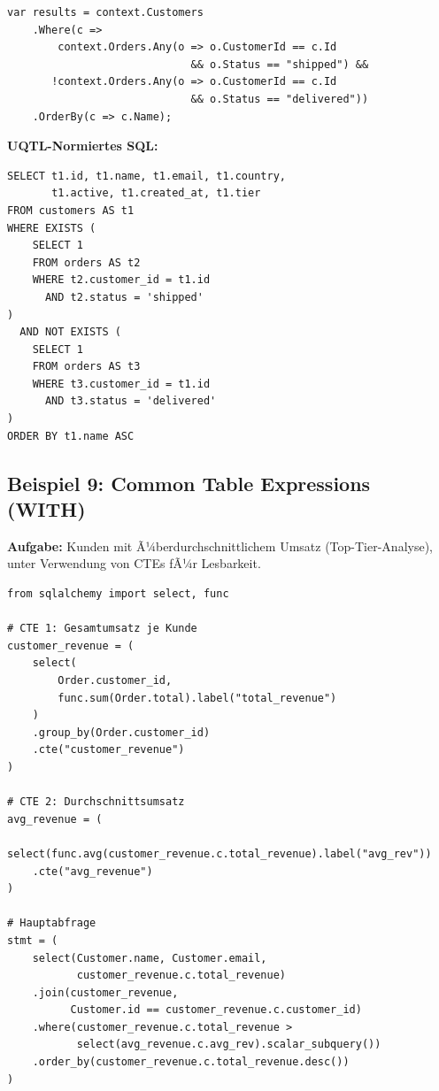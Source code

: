 \begin{lstlisting}[style=csharpstyle, caption={Beispiel 8 -- C\# (EXISTS via Any)},
  label=lst:bsp8_cs]
var results = context.Customers
    .Where(c =>
        context.Orders.Any(o => o.CustomerId == c.Id
                             && o.Status == "shipped") &&
       !context.Orders.Any(o => o.CustomerId == c.Id
                             && o.Status == "delivered"))
    .OrderBy(c => c.Name);
\end{lstlisting}

\begin{successbox}
\textbf{UQTL-Normiertes SQL:}
\begin{lstlisting}[style=sqlstyle, numbers=none]
SELECT t1.id, t1.name, t1.email, t1.country,
       t1.active, t1.created_at, t1.tier
FROM customers AS t1
WHERE EXISTS (
    SELECT 1
    FROM orders AS t2
    WHERE t2.customer_id = t1.id
      AND t2.status = 'shipped'
)
  AND NOT EXISTS (
    SELECT 1
    FROM orders AS t3
    WHERE t3.customer_id = t1.id
      AND t3.status = 'delivered'
)
ORDER BY t1.name ASC
\end{lstlisting}
\end{successbox}

\subsection{Beispiel 9: Common Table Expressions (WITH)}
\label{subsec:bsp9}

\textbf{Aufgabe:} Kunden mit Ã¼berdurchschnittlichem Umsatz (Top-Tier-Analyse),
unter Verwendung von CTEs fÃ¼r Lesbarkeit.

\begin{lstlisting}[style=pythonstyle, caption={Beispiel 9 -- Python (CTE)},
  label=lst:bsp9_py]
from sqlalchemy import select, func

# CTE 1: Gesamtumsatz je Kunde
customer_revenue = (
    select(
        Order.customer_id,
        func.sum(Order.total).label("total_revenue")
    )
    .group_by(Order.customer_id)
    .cte("customer_revenue")
)

# CTE 2: Durchschnittsumsatz
avg_revenue = (
    select(func.avg(customer_revenue.c.total_revenue).label("avg_rev"))
    .cte("avg_revenue")
)

# Hauptabfrage
stmt = (
    select(Customer.name, Customer.email,
           customer_revenue.c.total_revenue)
    .join(customer_revenue,
          Customer.id == customer_revenue.c.customer_id)
    .where(customer_revenue.c.total_revenue >
           select(avg_revenue.c.avg_rev).scalar_subquery())
    .order_by(customer_revenue.c.total_revenue.desc())
)
\end{lstlisting}

